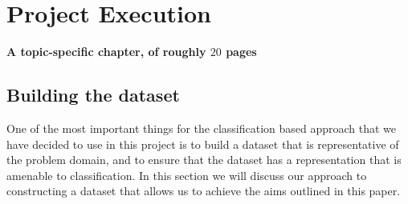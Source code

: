 \documentclass[ %
                    author={Sam Phippen},
                supervisor={Dr. Rafal Bogacz},
                     title={Real time voice activity detectors in noisy personal computing environments},
                  subtitle={},
                    degree={MEng},
                      year={2012} ]{thesis}
\begin{document}
\chapter{Project Execution}
\label{chap:execution}

{\bf A topic-specific chapter, of roughly $20$ pages} 
\vspace{1cm} 

%
%
%

\section{Building the dataset}

One of the most important things for the classification based approach that we
have decided to use in this project is to build a dataset that is
representative of the problem domain, and to ensure that the dataset has a
representation that is amenable to classification. In this section we will
discuss our approach to constructing a dataset that allows us to achieve the
aims outlined in this paper.
\end{document}
